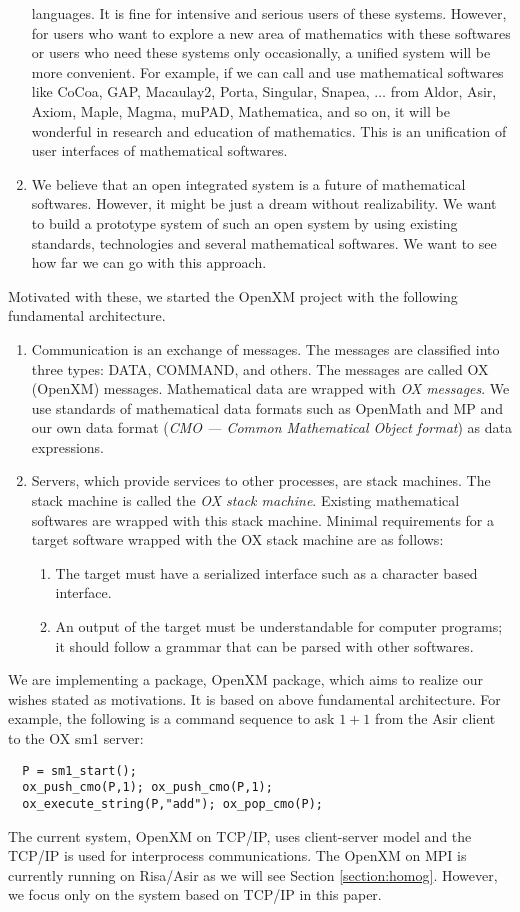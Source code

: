\begin{enumerate}
languages.
It is fine for intensive and serious users of these systems.
However, for users who want to explore a new area of mathematics with these
softwares or users who need these systems only occasionally,
a unified system will be more convenient.
For example, if we can call and use mathematical softwares
like CoCoa, GAP, Macaulay2, Porta, Singular, Snapea, $\ldots$
from Aldor, Asir, Axiom, Maple, Magma, muPAD, Mathematica, and so on,
it will be wonderful in research and education
of mathematics. This is an unification of user interfaces of mathematical
softwares.
\item  We believe that an open integrated system is a future of mathematical
softwares.
However, it might be just a dream without realizability.
We want to build a prototype system of such an open system by using
existing standards, technologies and several mathematical softwares.
We want to see how far we can go with this approach.
\end{enumerate}

Motivated with these, we started the OpenXM project with the following
fundamental architecture.
\begin{enumerate}
\item Communication is an exchange of messages. The messages are classified into
three types:
DATA, COMMAND, and others.
The messages are called OX (OpenXM) messages.
Mathematical data are wrapped with {\it OX messages}.
We use standards of mathematical data formats such as OpenMath and MP
and our own data format ({\it CMO --- Common Mathematical Object format})
as data expressions.
\item Servers, which provide services to other processes, are stack machines.
The stack machine is called the
{\it OX stack machine}.
Existing mathematical softwares are wrapped with this stack machine.
Minimal requirements for a target software wrapped with the OX stack machine
are as follows:
\begin{enumerate}
\item The target must have a serialized interface such as a character based
interface.
\item An output of the target must be understandable for computer programs;
it should follow a grammar that can be parsed with other softwares.
\end{enumerate}
\end{enumerate}
We are implementing a package, OpenXM package,  
which aims to realize our wishes stated as motivations.
It is based on above fundamental architecture.
For example, the following is a command sequence to ask $1+1$ from
the Asir client to the OX sm1 server:
\begin{verbatim}
  P = sm1_start();
  ox_push_cmo(P,1); ox_push_cmo(P,1);
  ox_execute_string(P,"add"); ox_pop_cmo(P);
\end{verbatim}
The current system, OpenXM on TCP/IP, 
uses client-server model and the TCP/IP is used for interprocess
communications.
The OpenXM on MPI \cite{MPI} is currently running on Risa/Asir
as we will see Section \ref{section:homog}.
However, we focus only on the system based on TCP/IP in this paper.




